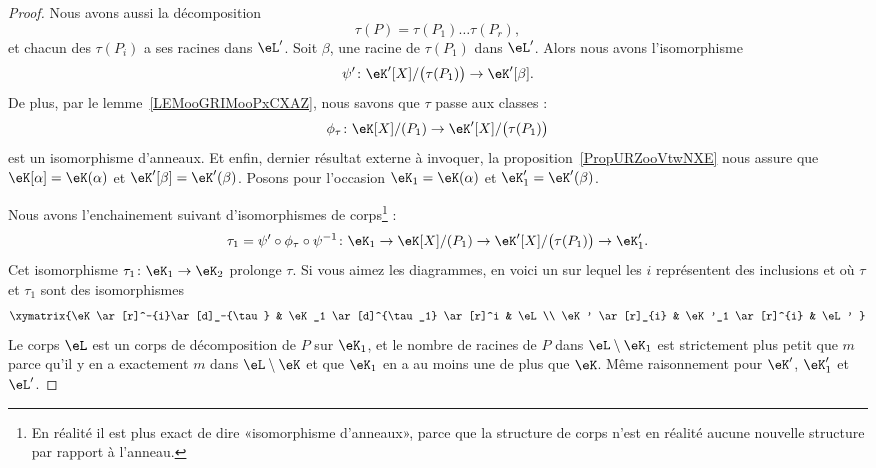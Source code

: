 \begin{proof}
    Nous avons aussi la décomposition
    \begin{equation}
        \tau(P)=\tau(P_1)\ldots \tau(P_r),
    \end{equation}
    et chacun des \( \tau(P_i)\) a ses racines dans \( \eL'\). Soit \( \beta\), une racine de \( \tau(P_1)\) dans \( \eL'\). Alors nous avons l'isomorphisme
    \begin{equation}
        \psi'\colon \eK'[X]/\big( \tau(P_1) \big)\to \eK'[\beta].
    \end{equation}
    De plus, par le lemme~\ref{LEMooGRIMooPxCXAZ}, nous savons que \( \tau\) passe aux classes :
    \begin{equation}
        \phi_{\tau}\colon \eK[X]/(P_1)\to \eK'[X]/\big( \tau(P_1) \big)
    \end{equation}
    est un isomorphisme d'anneaux. Et enfin, dernier résultat externe à invoquer, la proposition~\ref{PropURZooVtwNXE} nous assure que \( \eK[\alpha]=\eK(\alpha)\) et \( \eK'[\beta]=\eK'(\beta)\). Posons pour l'occasion \( \eK_1=\eK(\alpha)\) et \( \eK'_1=\eK'(\beta)\).

    Nous avons l'enchainement suivant d'isomorphismes de corps\footnote{En réalité il est plus exact de dire «isomorphisme d'anneaux», parce que la structure de corps n'est en réalité aucune nouvelle structure par rapport à l'anneau.} :
    \begin{equation}
        \tau_1=\psi'\circ\phi_{\tau}\circ\psi^{-1} \colon \eK_1\to \eK[X]/(P_1)\to\eK'[X]/\big( \tau(P_1) \big)\to \eK'_1.
    \end{equation}
    Cet isomorphisme \( \tau_1\colon \eK_1\to \eK_2\) prolonge \( \tau\). Si vous aimez les diagrammes, en voici un sur lequel les \( i\) représentent des inclusions et où \( \tau\) et \( \tau_1\) sont des isomorphismes
    \begin{equation}
        \xymatrix{%
            \eK \ar[r]^-{i}\ar[d]_-{\tau}       &   \eK_1   \ar[d]^{\tau_1} \ar[r]^i    &   \eL\\
            \eK' \ar[r]_{i}                     &   \eK'_1  \ar[r]^{i}                  &   \eL'
        }
    \end{equation}
    Le corps \( \eL\) est un corps de décomposition de \( P\) sur \( \eK_1\), et le nombre de racines de \( P\) dans \( \eL\setminus\eK_1\) est strictement plus petit que \( m\) parce qu'il y en a exactement \( m\) dans \( \eL\setminus \eK\) et que \( \eK_1\) en a au moins une de plus que \( \eK\). Même raisonnement pour \( \eK'\), \( \eK'_1\) et \( \eL'\).


\end{proof}
